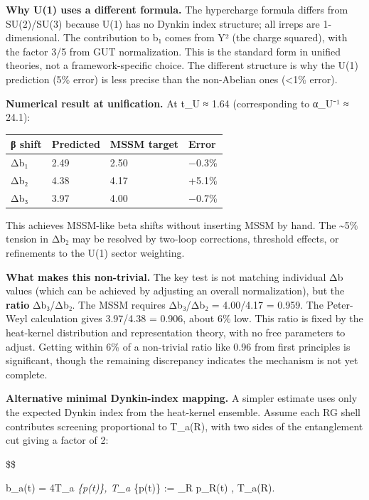 \documentclass[11pt,a4paper]{article}
\theoremstyle{remark}
\begin{document}
\textbf{Why U(1) uses a different formula.} The hypercharge formula differs from SU(2)/SU(3) because U(1) has no Dynkin index structure; all irreps are 1-dimensional. The contribution to b₁ comes from Y² (the charge squared), with the factor 3/5 from GUT normalization. This is the standard form in unified theories, not a framework-specific choice. The different structure is why the U(1) prediction (5\% error) is less precise than the non-Abelian ones (\textless1\% error).

\textbf{Numerical result at unification.} At t\_U ≈ 1.64 (corresponding to α\_U⁻¹ ≈ 24.1):

{\def\LTcaptype{none} %
\begin{longtable}[]{@{}llll@{}}
\toprule\noalign{}
β shift & Predicted & MSSM target & Error \\
\midrule\noalign{}
\endhead
\bottomrule\noalign{}
\endlastfoot
Δb₁ & 2.49 & 2.50 & −0.3\% \\
Δb₂ & 4.38 & 4.17 & +5.1\% \\
Δb₃ & 3.97 & 4.00 & −0.7\% \\
\end{longtable}
}

This achieves MSSM-like beta shifts without inserting MSSM by hand. The \textasciitilde5\% tension in Δb₂ may be resolved by two-loop corrections, threshold effects, or refinements to the U(1) sector weighting.

\textbf{What makes this non-trivial.} The key test is not matching individual Δb values (which can be achieved by adjusting an overall normalization), but the \textbf{ratio} Δb₃/Δb₂. The MSSM requires Δb₃/Δb₂ = 4.00/4.17 = 0.959. The Peter-Weyl calculation gives 3.97/4.38 = 0.906, about 6\% low. This ratio is fixed by the heat-kernel distribution and representation theory, with no free parameters to adjust. Getting within 6\% of a non-trivial ratio like 0.96 from first principles is significant, though the remaining discrepancy indicates the mechanism is not yet complete.

\textbf{Alternative minimal Dynkin-index mapping.} A simpler estimate uses only the expected Dynkin index from the heat-kernel ensemble. Assume each RG shell contributes screening proportional to T\_a(R), with two sides of the entanglement cut giving a factor of 2:

\$\$

\Delta b\_a(t) = 4\pi \langle T\_a \rangle\emph{\{p(t)\}, \qquad
\langle T\_a \rangle}\{p(t)\} := \sum\_R p\_R(t) , T\_a(R).
\end{document}
